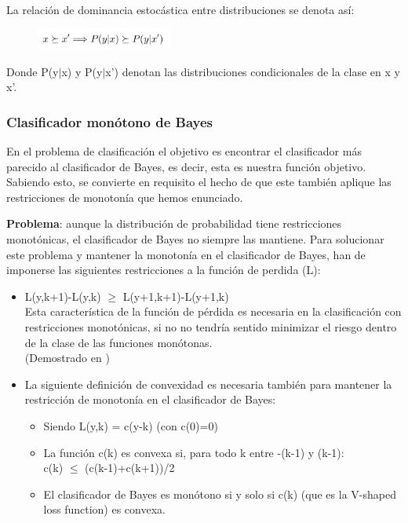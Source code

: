 La relación de dominancia estocástica entre distribuciones se denota así:\\


\begin{figure}[H]
	\centering
	\includegraphics[width=0.4\textwidth]{imagenes/f1}
\end{figure}



Donde P(y$|$x) y P(y$|$x') denotan las distribuciones condicionales de la clase en x y x'. 

\subsubsection{Clasificador monótono de Bayes}

En el problema de clasificación el objetivo es encontrar el clasificador más
parecido al clasificador de Bayes, es decir, esta es nuestra función objetivo.
Sabiendo esto, se convierte en requisito el hecho de que este también aplique
las restricciones de monotonía que hemos enunciado. 

\textbf{Problema}: aunque la
distribución de probabilidad tiene restricciones monotónicas, el clasificador
de Bayes no siempre las mantiene.
Para solucionar este problema y mantener la monotonía en el clasificador de 
Bayes, han de imponerse las siguientes restricciones a la función de perdida
(L):

\begin{itemize}
	\item L(y,k+1)-L(y,k) $\ge$ L(y+1,k+1)-L(y+1,k) \\
	Esta característica de la función de pérdida es necesaria
	en la clasificación con restricciones monotónicas, si no no
	tendría sentido minimizar el riesgo dentro de la clase de las funciones monótonas.\\
	(Demostrado en \cite{ref17})
	\item La siguiente definición de convexidad es necesaria también para
	mantener la restricción de monotonía en el clasificador de Bayes:
		\begin{itemize}
			\item Siendo L(y,k) = c(y-k) (con c(0)=0)
			\item La función c(k) es convexa si, para todo k entre -(k-1) y (k-1):\\
			c(k) $\le$ (c(k-1)+c(k+1))/2
			\item El clasificador de Bayes es monótono si y solo si c(k) (que es
			la V-shaped loss function) es convexa.
		\end{itemize}
\end{itemize}


